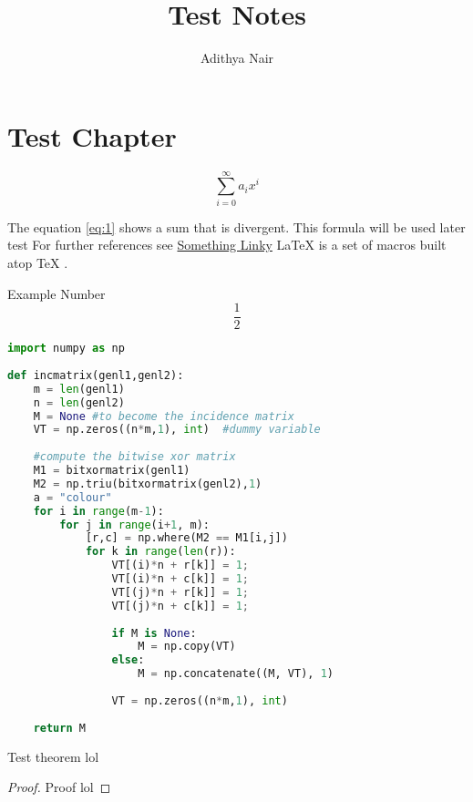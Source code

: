 \documentclass[twoside]{report}
\title{Test Notes}
\author{Adithya Nair}
\begin{document}
\chapter{Test Chapter}
\begin{equation}
\sum_{i=0}^{\infty} a_i x^i
\label{eq:1}
\end{equation}

The equation \ref{eq:1} shows a sum that is divergent. This formula will be used later
test
For further references see \href{http://www.overleaf.com}{Something Linky}
\LaTeX{} \cite{latex2e} is a set of macros built atop \TeX{} \cite{texbook}.

\begin{example}
	Example Number
	\[\frac{1}{2}\]
\end{example}
\begin{lstlisting}[language=Python, caption=Python example]
import numpy as np
    
def incmatrix(genl1,genl2):
    m = len(genl1)
    n = len(genl2)
    M = None #to become the incidence matrix
    VT = np.zeros((n*m,1), int)  #dummy variable
    
    #compute the bitwise xor matrix
    M1 = bitxormatrix(genl1)
    M2 = np.triu(bitxormatrix(genl2),1) 
    a = "colour"
    for i in range(m-1):
        for j in range(i+1, m):
            [r,c] = np.where(M2 == M1[i,j])
            for k in range(len(r)):
                VT[(i)*n + r[k]] = 1;
                VT[(i)*n + c[k]] = 1;
                VT[(j)*n + r[k]] = 1;
                VT[(j)*n + c[k]] = 1;
                
                if M is None:
                    M = np.copy(VT)
                else:
                    M = np.concatenate((M, VT), 1)
                
                VT = np.zeros((n*m,1), int)
    
    return M
\end{lstlisting}

\begin{theorem}
	Test theorem lol
\end{theorem}
\begin{proof}
	Proof lol
\end{proof}


\end{document}

